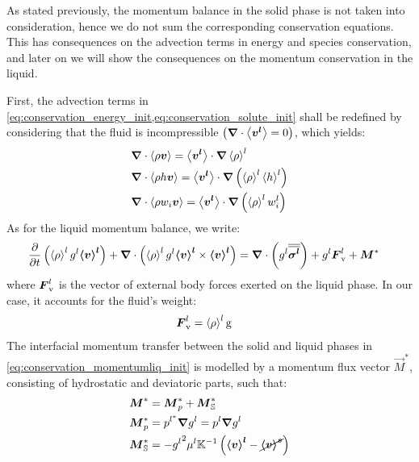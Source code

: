 As stated previously, the momentum balance in the solid phase is not taken into consideration, hence we do not sum the corresponding
conservation equations. This has consequences on the advection terms in energy and species conservation, and later on we will show
the consequences on the momentum conservation in the liquid. 

First, the advection terms in \cref{eq:conservation_energy_init,eq:conservation_solute_init}
shall be redefined by considering that the fluid is incompressible $\left( \boldsymbol{\nabla} \cdot \left \langle \boldsymbol{v^l} \right \rangle = 0 \right)$, which yields:
\begin{align}
\label{eq:constantrhol_mass}
& \nabvec \cdot \avg{\rho \vec{v}} = \vit \cdot \nabvec \rhol \\
\label{eq:constantrhol_energy}
& \nabvec \cdot \avg{\rho h \vec{v}} = \vit \cdot \nabvec \brac{\rhol \hl} \\
\label{eq:constantrhol_solute}
& \nabvec \cdot \avg{\rho w_i \vec{v}} = \vit \cdot \nabvec \brac{\rhol \wil}
\end{align}
As for the liquid momentum balance, we write:
\begin{align}
\label{eq:conservation_momentumliq_init}
& \temp{ \rhol \gl \vl } + \nabvec \cdot \brac{\rhol \gl \vl \times \vl} = 
	\nabvec \cdot \brac{\gl \sigmal} +\gl \Fv + \vec{M}^{*}
\end{align}
where $\boldsymbol{F}_{\text{v}}^l$ is the vector of external body forces exerted on the liquid phase. In our case, it accounts for the fluid's weight:
\begin{align}
\label{eq:fluid_weight}
& \Fv = \rhol \gravity
\end{align}
The interfacial momentum transfer between the solid and liquid phases in \cref{eq:conservation_momentumliq_init} is modelled 
by a momentum flux vector $\vec{M}^{*}$, consisting of hydrostatic and deviatoric parts, such that:
\begin{align}
	\label{eq:interfacial_momentum_total}
	& \vec{M}^{*} =  \vec{M}^{*}_{p} + \vec{M}^{*}_{\mathbb{S}}	\\
	\label{eq:interfacial_momentum_hydrostatic}
	& \vec{M}^{*}_{p} = p^{l^{*}} \nabvec g^{l} = p^{l} \nabvec g^{l}		\\
	\label{eq:interfacial_momentum_deviatoric}
	& \vec{M}^{*}_{\mathbb{S}} = - \gl^2 \mul \K^{-1} \brac{ \vl - \cancel{\vs} }  
\end{align}
